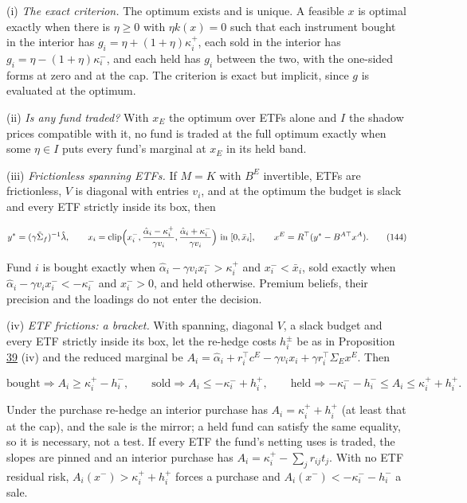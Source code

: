 \documentclass[11pt]{article}
\begin{document}
(i) \emph{The exact criterion.} The optimum exists and is unique. A
feasible \(x\) is optimal exactly when there is \(\eta\geq0\) with \(\eta k(x)=0\)
such that each instrument bought in the interior has
\(g_i=\eta+(1+\eta)\kappa^+_i\), each sold in the interior has
\(g_i=\eta-(1+\eta)\kappa^-_i\), and each held has \(g_i\) between the two, with
the one-sided forms at zero and at the cap. The criterion is exact but
implicit, since \(g\) is evaluated at the optimum.

(ii) \emph{Is any fund traded?} With \(x_E\) the optimum over ETFs alone and \(I\)
the shadow prices compatible with it, no fund is traded at the full
optimum exactly when some \(\eta\in I\) puts every fund's marginal at \(x_E\)
in its held band.

(iii) \emph{Frictionless spanning ETFs.} If \(M=K\) with \(B^E\) invertible, ETFs
are frictionless, \(V\) is diagonal with entries \(v_i\), and at the optimum
the budget is slack and every ETF strictly inside its box, then

\begin{equation*}
y^*=(\gamma\tilde\Sigma_f)^{-1}\hat\lambda,\qquad
x_i=\mathrm{clip}\Bigl(x^-_i,\frac{\hat\alpha_i-\kappa^+_i}{\gamma v_i},\frac{\hat\alpha_i+\kappa^-_i}{\gamma v_i}\Bigr)\text{ in }[0,\bar x_i],\qquad
x^E=R^\top(y^*-B^{A\top}x^A).\tag{144}\label{eq:144}
\end{equation*}

Fund \(i\) is bought exactly when \(\hat\alpha_i-\gamma v_ix^-_i>\kappa^+_i\) and
\(x^-_i<\bar x_i\), sold exactly when \(\hat\alpha_i-\gamma v_ix^-_i<-\kappa^-_i\) and \(x^-_i>0\),
and held otherwise. Premium beliefs, their precision and the loadings
do not enter the decision.

(iv) \emph{ETF frictions: a bracket.} With spanning, diagonal \(V\), a slack
budget and every ETF strictly inside its box, let the re-hedge costs
\(h^\pm_i\) be as in Proposition \hyperref[res:Proposition-39]{39} (iv) and the reduced marginal be
\(A_i=\hat\alpha_i+r_i^\top c^E-\gamma v_ix_i+\gamma r_i^\top\Sigma_Ex^E\). Then

\begin{equation*}
\text{bought}\Rightarrow A_i\geq\kappa^+_i-h^-_i,\qquad
\text{sold}\Rightarrow A_i\leq-\kappa^-_i+h^+_i,\qquad
\text{held}\Rightarrow-\kappa^-_i-h^-_i\leq A_i\leq\kappa^+_i+h^+_i.\tag{145}\label{eq:145}
\end{equation*}

Under the purchase re-hedge an interior purchase has
\(A_i=\kappa^+_i+h^+_i\) (at least that at the cap), and the sale is the
mirror; a held fund can satisfy the same equality, so it is necessary,
not a test. If every ETF the fund's netting uses is traded, the
slopes are pinned and an interior purchase has
\(A_i=\kappa^+_i-\sum_jr_{ij}t_j\). With no ETF residual risk,
\(A_i(x^-)>\kappa^+_i+h^+_i\) forces a purchase and \(A_i(x^-)<-\kappa^-_i-h^-_i\) a sale.
\end{document}
